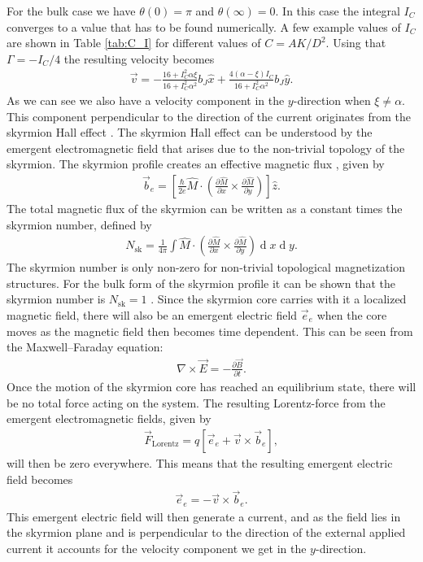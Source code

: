 \documentclass[12pt, a4paper, twoside, openright]{article}		%
\renewcommand{\d}[1]{\ensuremath{\operatorname{d}\!{#1}}}
\numberwithin{equation}{section}
\begin{document}
For the bulk case we have $\theta(0) = \pi$ and $\theta(\infty) = 0$. In this case the integral $I_C$ converges to a value that has to be found numerically. A few example values of $I_C$ are shown in Table \ref{tab:C_I} for different values of $C = AK/D^2$. Using that $\Gamma = -I_C/4$ the resulting velocity becomes
\begin{align}
\vec{v} = -\frac{16+I_C^2\alpha\xi}{16+I_C^2\alpha^2}b_J\hat{x} + \frac{4(\alpha-\xi)I_C}{16+I_C^2\alpha^2}b_J\hat{y}.
\label{eq:SkyrmionV}
\end{align}
As we can see we also have a velocity component in the $y$-direction when $\xi\neq\alpha$. This component perpendicular to the direction of the current originates from the skyrmion Hall effect \cite{Nagaosa2013}\cite{Zang2011}. The skyrmion Hall effect can be understood by the emergent electromagnetic field that arises due to the non-trivial topology of the skyrmion. The skyrmion profile creates an effective magnetic flux \cite{Nagaosa2012}, given by
\begin{align}
\vec{b}_e = \left[\frac{\hbar}{2 e} \hat{M} \cdot \left( \frac{\partial \hat{M}}{\partial x} \times \frac{\partial \hat{M}}{\partial y}\right)\right]\hat{z}.
\end{align}
The total magnetic flux of the skyrmion can be written as a constant times the skyrmion number, defined by \cite{Heinze2011}
\begin{align}
N_{\textrm{sk}} = \frac{1}{4\pi}\int \hat{M}\cdot\left(\frac{\partial \hat{M}}{\partial x} \times \frac{\partial \hat{M}}{\partial y}\right) \d x \d y.
\end{align}
The skyrmion number is only non-zero for non-trivial topological magnetization structures. For the bulk form of the skyrmion profile it can be shown that the skyrmion number is $N_{\textrm{sk}} = 1$ \cite{Nagaosa2013}. Since the skyrmion core carries with it a localized magnetic field, there will also be an emergent electric field $\vec{e}_e$ \cite{Schulz2012} when the core moves as the magnetic field then becomes time dependent. This can be seen from the Maxwell--Faraday equation:
\begin{align}
\nabla\times\vec{E} = -\frac{\partial\vec{B}}{\partial t}.
\end{align}
Once the motion of the skyrmion core has reached an equilibrium state, there will be no total force acting on the system. The resulting Lorentz-force from the emergent electromagnetic fields, given by
\begin{align}
\label{eq:LorentzForce}
\vec{F}_{\textrm{Lorentz}} = q\left[\vec{e}_e + \vec{v}\times\vec{b}_e\right],
\end{align}
will then be zero everywhere. This means that the resulting emergent electric field becomes
\begin{align}
\vec{e}_e = -\vec{v}\times\vec{b}_e.
\end{align}
This emergent electric field will then generate a current, and as the field lies in the skyrmion plane and is perpendicular to the direction of the external applied current it accounts for the velocity component we get in the $y$-direction.
\end{document}
